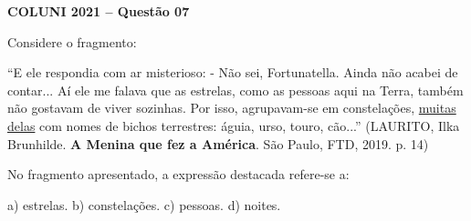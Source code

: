 \textbf{COLUNI 2021 -- Questão 07}\par\medskip Considere o fragmento:

\par

“E ele respondia com ar misterioso: - Não sei, Fortunatella. Ainda não acabei de contar... Aí ele me falava que as estrelas, como as pessoas aqui na Terra, também não gostavam de viver sozinhas. Por isso, agrupavam-se em constelações, \underline{muitas delas} com nomes de bichos terrestres: águia, urso, touro, cão...” (LAURITO, Ilka Brunhilde. \textbf{A Menina que fez a América}. São Paulo, FTD, 2019. p. 14)

\par

No fragmento apresentado, a expressão destacada refere-se a:

\par

a) estrelas. b) constelações. c) pessoas. d) noites.
